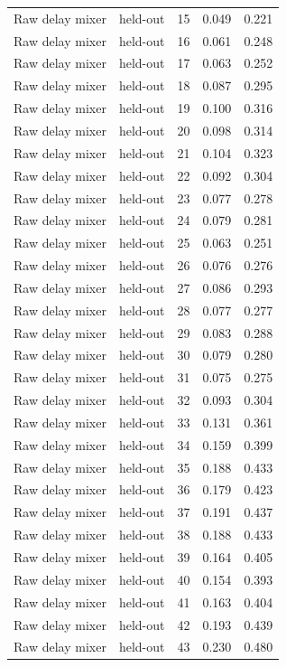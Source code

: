 \begin{tabular}{llrrr}
Raw delay mixer & held-out & 15 & 0.049 & 0.221 \\
Raw delay mixer & held-out & 16 & 0.061 & 0.248 \\
Raw delay mixer & held-out & 17 & 0.063 & 0.252 \\
Raw delay mixer & held-out & 18 & 0.087 & 0.295 \\
Raw delay mixer & held-out & 19 & 0.100 & 0.316 \\
Raw delay mixer & held-out & 20 & 0.098 & 0.314 \\
Raw delay mixer & held-out & 21 & 0.104 & 0.323 \\
Raw delay mixer & held-out & 22 & 0.092 & 0.304 \\
Raw delay mixer & held-out & 23 & 0.077 & 0.278 \\
Raw delay mixer & held-out & 24 & 0.079 & 0.281 \\
Raw delay mixer & held-out & 25 & 0.063 & 0.251 \\
Raw delay mixer & held-out & 26 & 0.076 & 0.276 \\
Raw delay mixer & held-out & 27 & 0.086 & 0.293 \\
Raw delay mixer & held-out & 28 & 0.077 & 0.277 \\
Raw delay mixer & held-out & 29 & 0.083 & 0.288 \\
Raw delay mixer & held-out & 30 & 0.079 & 0.280 \\
Raw delay mixer & held-out & 31 & 0.075 & 0.275 \\
Raw delay mixer & held-out & 32 & 0.093 & 0.304 \\
Raw delay mixer & held-out & 33 & 0.131 & 0.361 \\
Raw delay mixer & held-out & 34 & 0.159 & 0.399 \\
Raw delay mixer & held-out & 35 & 0.188 & 0.433 \\
Raw delay mixer & held-out & 36 & 0.179 & 0.423 \\
Raw delay mixer & held-out & 37 & 0.191 & 0.437 \\
Raw delay mixer & held-out & 38 & 0.188 & 0.433 \\
Raw delay mixer & held-out & 39 & 0.164 & 0.405 \\
Raw delay mixer & held-out & 40 & 0.154 & 0.393 \\
Raw delay mixer & held-out & 41 & 0.163 & 0.404 \\
Raw delay mixer & held-out & 42 & 0.193 & 0.439 \\
Raw delay mixer & held-out & 43 & 0.230 & 0.480 \\

\end{tabular}
